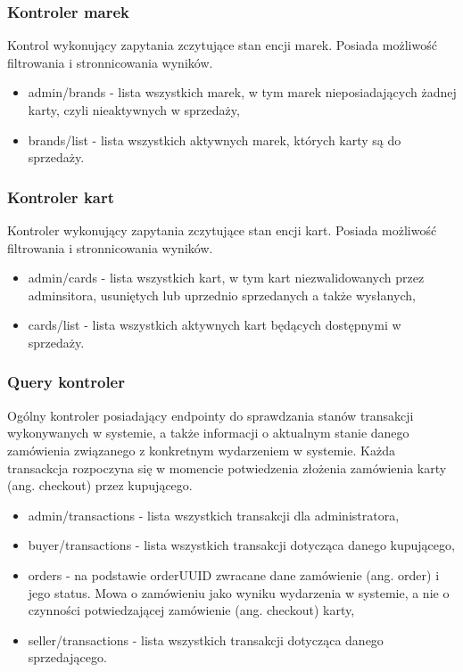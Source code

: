 \subsubsection{Kontroler marek}
Kontrol wykonujący zapytania zczytujące stan encji marek. Posiada możliwość filtrowania i stronnicowania wyników.

\begin{itemize}
    \item admin/brands - lista wszystkich marek, w tym marek nieposiadających żadnej karty, czyli nieaktywnych w sprzedaży,
    \item brands/list - lista wszystkich aktywnych marek, których karty są do sprzedaży.
\end{itemize}

\subsubsection{Kontroler kart}
Kontroler wykonujący zapytania zczytujące stan encji kart. Posiada możliwość filtrowania i stronnicowania wyników.

\begin{itemize}
    \item admin/cards - lista wszystkich kart, w tym kart niezwalidowanych przez adminsitora, usuniętych lub uprzednio sprzedanych a także wysłanych,
    \item cards/list - lista wszystkich aktywnych kart będących dostępnymi w sprzedaży.
\end{itemize}

\subsubsection{Query kontroler}
Ogólny kontroler posiadający endpointy do sprawdzania stanów transakcji wykonywanych w systemie, a także informacji o aktualnym stanie danego zamówienia związanego z konkretnym wydarzeniem w systemie. Każda transackcja rozpoczyna się w momencie potwiedzenia złożenia zamówienia karty (ang. checkout) przez kupującego.

\begin{itemize}
    \item admin/transactions - lista wszystkich transakcji dla administratora,
    \item buyer/transactions - lista wszystkich transakcji dotycząca danego kupującego,
    \item orders - na podstawie orderUUID zwracane dane zamówienie (ang. order) i jego status. Mowa o zamówieniu jako wyniku wydarzenia w systemie, a nie o czynności potwiedzającej zamówienie (ang. checkout) karty,
    \item seller/transactions - lista wszystkich transakcji dotycząca danego sprzedającego.
\end{itemize}

